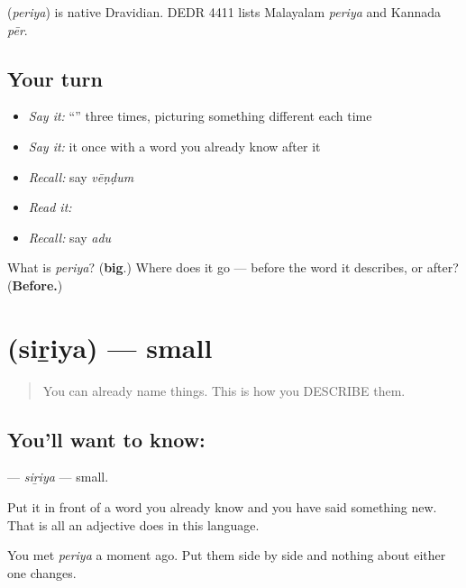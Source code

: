 \begin{cousinweb}
\textbf{} (\emph{periya}) is native Dravidian. DEDR 4411 lists Malayalam \emph{periya} and Kannada \emph{pēr}.
\end{cousinweb}

\subsection*{Your turn}
\begin{itemize}
\raggedright
  \item \emph{Say it:} \textquotedblleft{}\textquotedblright{} three times, picturing something different each time
  \item \emph{Say it:} it once with a word you already know after it
  \item \emph{Recall:} say \emph{vēṇḍum}
  \item \emph{Read it:} \textbf{}
  \item \emph{Recall:} say \emph{adu}
\end{itemize}

\begin{tcolorbox}[breakable,colback=teal!4,colframe=teal!35!black,title={Before you move on}]
What is \emph{periya}? (\textbf{big}.) Where does it go — before the word it describes, or after? (\textbf{Before.})
\end{tcolorbox}
\section[\texorpdfstring{\ta{சிறிய} (siṟiya)}{சிறிய (siṟiya)}]{ (siṟiya) — small}

\label{lesson:TA-C41-small}



\begin{quote}
You can already name things. This is how you DESCRIBE them.
\end{quote}

\subsection*{You'll want to know: }
\textbf{} — \emph{siṟiya} — small.

Put it in front of a word you already know and you have said something new. That is all an adjective does in this language.

You met \textbf{} \emph{periya} a moment ago. Put them side by side and nothing about either one changes.

